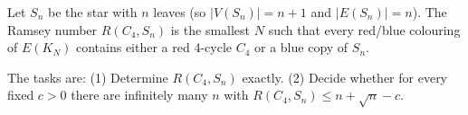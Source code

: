 Let $S_n$ be the star with $n$ leaves (so $|V(S_n)|=n+1$ and $|E(S_n)|=n$). The Ramsey number $R(C_4,S_n)$ is the smallest $N$ such that every red/blue colouring of $E(K_N)$ contains either a red 4-cycle $C_4$ or a blue copy of $S_n$.

The tasks are:
(1) Determine $R(C_4,S_n)$ exactly.
(2) Decide whether for every fixed $c>0$ there are infinitely many $n$ with $R(C_4,S_n)\le n+\sqrt n - c$.

